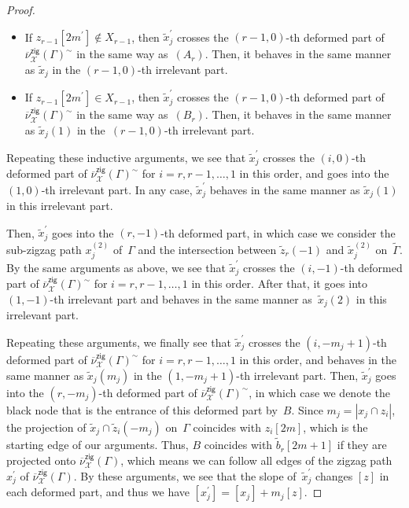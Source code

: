 \documentclass[pdftex]{sigma}%
\numberwithin{equation}{section}
\numberwithin{figure}{section}
\numberwithin{table}{section}
\newcommand{\calX}{\mathcal{X}}
\newcommand{\zig}{\mathsf{zig}}
\begin{document}
\begin{proof}
\begin{itemize}
\begin{itemize}
\item If $z_{r-1}[2m^\prime]\not\in X_{r-1}$, then $\widetilde{x}_j^\prime$ crosses the $(r-1,0)$-th deformed part of $\overline{\nu}_\calX^\zig(\Gamma)^\sim$ in the same way as~$(A_r)$.
Then, it behaves in the same manner as $\widetilde{x}_j$ in the $(r-1,0)$-th irrelevant part.
\item If $z_{r-1}[2m^\prime]\in X_{r-1}$, then $\widetilde{x}_j^\prime$ crosses the $(r-1,0)$-th deformed part of $\overline{\nu}_\calX^\zig(\Gamma)^\sim$ in the same way as~$(B_r)$.
Then, it behaves in the same manner as $\widetilde{x}_j(1)$ in the~$(r-1,0)$-th irrelevant part.
\end{itemize}
\end{itemize}
Repeating these inductive arguments, we see that $\widetilde{x}^\prime_j$ crosses the $(i,0)$-th deformed part of $\overline{\nu}_\calX^\zig(\Gamma)^\sim$ for $i=r,r-1,\dots,1$ in this order, and goes into the $(1,0)$-th irrelevant part.
In any case, $\widetilde{x}^\prime_j$ behaves in the same manner as $\widetilde{x}_j(1)$ in this irrelevant part.

Then, $\widetilde{x}^\prime_j$ goes into the $(r,-1)$-th deformed part, in which case we consider the sub-zigzag path $x_j^{(2)}$ of~$\Gamma$
and the intersection between $\widetilde{z}_r(-1)$ and $\widetilde{x}_j^{(2)}$ on~$\widetilde{\Gamma}$.
By the same arguments as above, we see that $\widetilde{x}^\prime_j$ crosses the $(i,-1)$-th deformed part of $\overline{\nu}_\calX^\zig(\Gamma)^\sim$ for $i=r,r-1,\dots,1$ in this order.
After that, it goes into $(1,-1)$-th irrelevant part and behaves in the same manner as~$\widetilde{x}_j(2)$ in this irrelevant part.

Repeating these arguments, we finally see that $\widetilde{x}^\prime_j$ crosses the $(i,-m_j+1)$-th deformed part of $\overline{\nu}_\calX^\zig(\Gamma)^\sim$ for $i=r,r-1,\dots,1$ in this order,
and behaves in the same manner as $\widetilde{x}_j(m_j)$ in the $(1,-m_j+1)$-th irrelevant part.
Then, $\widetilde{x}^\prime_j$ goes into the $(r,-m_j)$-th deformed part of $\overline{\nu}_\calX^\zig(\Gamma)^\sim$, in which case
we denote the black node that is the entrance of this deformed part by~$B$.
Since $m_j=|x_j\cap z_i|$, the projection of $\widetilde{x}_j\cap \widetilde{z}_i(-m_j)$ on~$\Gamma$ coincides with $z_i[2m]$, which is the starting edge of our arguments.
Thus, $B$ coincides with $\widetilde{b}_r[2m+1]$ if they are projected onto $\overline{\nu}_\calX^\zig(\Gamma)$,
which means we can follow all edges of the zigzag path $x^\prime_j$ of $\overline{\nu}_\calX^\zig(\Gamma)$.
By these arguments, we see that the slope of~$\widetilde{x}^\prime_j$ changes $[z]$ in each deformed part, and thus we have $[x^{\prime}_j]=[x_j]+m_j[z]$.


\end{proof}
\end{document}
